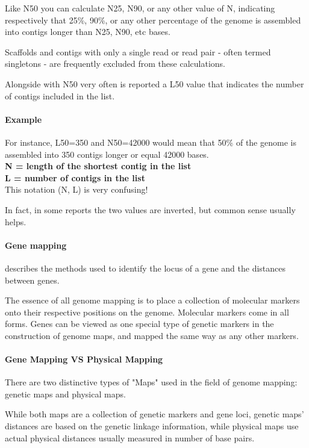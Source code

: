 Like N50 you can calculate N25, N90, or any other value of N, indicating
respectively that 25\%, 90\%, or any other percentage of the genome is
assembled into contigs longer than N25, N90, etc bases.

Scaffolds and contigs with only a single read or read pair - often termed
singletons - are frequently excluded from these calculations.

Alongside with N50 very often is reported a L50 value that indicates the
number of contigs included in the list.

\paragraph*{Example} For instance, L50=350 and N50=42000 would mean that 50\%
of the genome is assembled into 350 contigs longer or equal 42000 bases. \\

\textbf{N = length of the shortest contig in the list} \\

\textbf{L = number of contigs in the list} \\

This notation (N, L) is very confusing!

In fact, in some reports the two values are inverted, but common sense usually
helps. \\

\paragraph*{Gene mapping} describes the methods used to identify the locus of
a gene and the distances between genes.

The essence of all genome mapping is to place a collection of molecular
markers onto their respective positions on the genome.
Molecular markers come in all forms.
Genes can be viewed as one special type of genetic markers in the construction
of genome maps, and mapped the same way as any other markers. \\

\paragraph*{Gene Mapping VS Physical Mapping}
There are two distinctive types of "Maps" used in the field of genome mapping:
genetic maps and physical maps.

While both maps are a collection of genetic markers and gene loci,
genetic maps' distances are based on the genetic linkage information, while
physical maps use actual physical distances usually measured in number
of base pairs.

